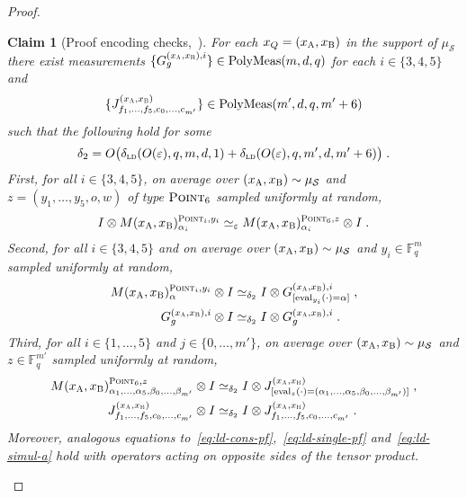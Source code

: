 \documentclass[11pt]{article}
\newtheorem{claim}[theorem]{Claim}
\theoremstyle{definition}
\newcommand{\F}{\ensuremath{\mathbb{F}}}
\newcommand{\ot}{\otimes}
\newcommand{\ld}{\textsc{ld}}
\newcommand{\eps}{\varepsilon}
\newcommand{\sampler}{\mathcal{S}}
\newcommand{\labelstyle}[1]{\ensuremath{\textsc{#1}}\xspace}
\newcommand{\alice}{\labelstyle{A}}
\newcommand{\bob}{\labelstyle{B}}
\newcommand{\typestyle}[1]{\ensuremath{\textsc{#1}}\xspace}
\newcommand{\Point}{\typestyle{Point}}
\newcommand{\polymeas}[3]{\mathrm{PolyMeas}(#1,#2,#3)}
\newcommand{\simulpolymeas}[4]{\mathrm{PolyMeas}(#1,#2,#3, #4)}
\newcommand{\eval}{\mathrm{eval}}
\begin{document}
\begin{proof}
  \begin{claim}[Proof encoding checks,~]
    \label{claim:ar-4}
    For each $x_Q=(x_\alice,x_\bob)$ in the support of $\mu_\sampler$ there
    exist measurements $\{G^{(x_\alice,x_\bob),i}_{g}\} \in \polymeas{m}{d}{q}$
    for each $i\in\{3,4,5\}$ and
    \begin{equation*}\{J^{({x}_\alice, {x}_\bob)}_{f_1, \dots, f_5, c_0,
      \dots, c_{m'}}\} \in \simulpolymeas{m'}{d}{q}{m'+6}
      \end{equation*}
      such that
    the following hold for some
    \begin{equation*}
      \delta_2 = O\big(\delta_{\ld}(O({\eps}), q, m, d, 1)+
      \delta_{\ld}(O({\eps}), q, m', d, m'+6)\big)\;.
    \end{equation*}
    First, for all $i\in \{3,4,5\}$, on average over $({x}_\alice, {x}_\bob)
    \sim \mu_{\sampler}$ and $z=(y_1,\ldots,y_5,o,w)$ of type $\Point_6$ sampled
    uniformly at random,
    \begin{equation}
      I \ot M({x}_\alice, {x}_\bob)^{ \Point_i, y_i}_{\alpha_i} \simeq_{\eps}
      M({x}_\alice, {x}_\bob)^{\Point_6, z}_{\alpha_i} \ot I\;.
      \label{eq:ld-cons-pf}
    \end{equation}
    Second, for all $i\in \{3,4,5\}$ and on average over $({x}_\alice, {x}_\bob)
    \sim \mu_{\sampler}$ and $y_i\in\F_q^m$ sampled uniformly at random,
    \begin{align}
      M({x}_\alice, {x}_\bob)^{\Point_i,  y_i}_{\alpha}\ot I
      &\simeq_{\delta_2} I \ot G^{({x}_\alice, {x}_\bob), i}_{[\eval_{y_i}(\cdot) =
        \alpha]}\;, \label{eq:ld-single-pf} \\
      G^{({x}_\alice, {x}_\bob), i}_{g} \ot I
      &\simeq_{\delta_2} I \ot G^{({x}_\alice, {x}_\bob),
        i}_{g}\;. \label{eq:ld-self-pf}
    \end{align}
    Third, for all $i\in\{1,\ldots,5\}$ and $j\in\{0,\ldots,m'\}$, on average
    over $({x}_\alice, {x}_\bob) \sim \mu_{\sampler}$ and $z\in\F_q^{m'}$
    sampled uniformly at random,
    \begin{align}
      M({x}_\alice, {x}_\bob)^{\Point_6,  z}_{\alpha_1, \ldots, \alpha_5,
      \beta_0, \ldots, \beta_{m'}} \ot I
      & \simeq_{\delta_2} I \ot J^{({x}_\alice, {x}_\bob) }_{[\eval_{z}(\cdot) =
        (\alpha_1,\ldots,\alpha_5,\beta_0,\ldots,\beta_{m'})]}\;,
        \label{eq:ld-simul-a}\\
      J^{({x}_\alice,{x}_\bob)}_{f_1, \dots, f_5, c_0, \dots, c_{m'}} \ot I
      &\simeq_{\delta_2} I \ot J^{({x}_\alice, {x}_\bob)}_{f_1, \dots, f_5,
        c_0, \dots, c_{m'}}\;.\label{eq:ld-self-simul}
    \end{align}
    Moreover, analogous equations
    to~\eqref{eq:ld-cons-pf},~\eqref{eq:ld-single-pf} and~\eqref{eq:ld-simul-a}
    hold with operators acting on opposite sides of the tensor product.
  \end{claim}
	

\end{proof}
\end{document}
